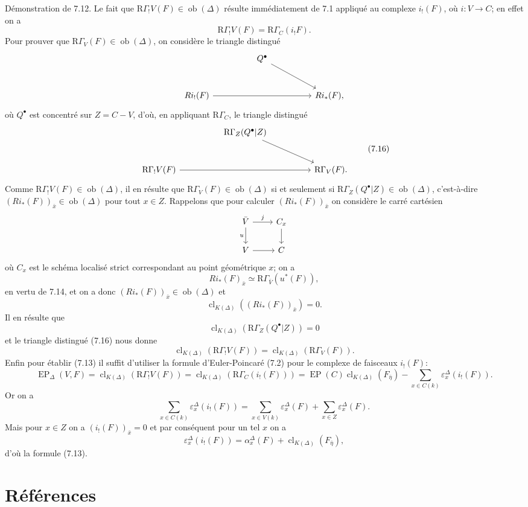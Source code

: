\documentclass[11pt]{article}
\providecommand{\EP}{\operatorname{EP}}
\providecommand{\Ob}{\operatorname{ob}}
\providecommand{\Ob}{\operatorname{ob}}
\providecommand{\EP}{\operatorname{EP}}
\providecommand{\Ob}{\operatorname{Ob}}
\providecommand{\clK}[1]{\operatorname{cl}_{K(#1)}}
\providecommand{\RG}{\mathrm R\Gamma}
\providecommand{\Ob}{\operatorname{ob}}
\providecommand{\Ob}{\operatorname{Ob}}
\begin{document}
Démonstration de 7.12. Le fait que $\RG_!V(F)\in\Ob(\Delta)$ résulte immédiatement de 7.1 appliqué au complexe $i_!(F)$, où $i:V\to C$; en effet on a
\[
\RG_!V(F)=\RG_C(i_!F).
\]
Pour prouver que $\RG_V(F)\in\Ob(\Delta)$, on considère le triangle distingué
\[
\begin{tikzcd}[column sep=huge,row sep=large]
& Q^\bullet \arrow[dr] &\\
Ri_!(F) \arrow[rr] && Ri_*(F),
\end{tikzcd}
\]
où $Q^\bullet$ est concentré sur $Z=C-V$, d'où, en appliquant $\RG_C$, le triangle distingué
\[
\begin{tikzcd}[column sep=huge,row sep=large]
& \RG_Z(Q^\bullet|Z) \arrow[dr] &\\
\RG_!V(F) \arrow[rr] && \RG_V(F).
\end{tikzcd}
\tag{7.16}
\]
Comme $\RG_!V(F)\in\Ob(\Delta)$, il en résulte que $\RG_V(F)\in\Ob(\Delta)$ si et seulement si $\RG_Z(Q^\bullet|Z)\in\Ob(\Delta)$, c'est-à-dire $(Ri_*(F))_{\bar x}\in\Ob(\Delta)$ pour tout $x\in Z$. Rappelons que pour calculer $(Ri_*(F))_{\bar x}$ on considère le carré cartésien
\[
\begin{tikzcd}
\bar V \arrow[r,"j"] \arrow[d,"u"'] & C_x \arrow[d]\\
V \arrow[r] & C
\end{tikzcd}
\]
où $C_x$ est le schéma localisé strict correspondant au point géométrique $x$; on a
\[
Ri_*(F)_{\bar x}\simeq \RG_{\bar V}(u^*(F)),
\]
en vertu de 7.14, et on a donc $(Ri_*(F))_{\bar x}\in\Ob(\Delta)$ et
\[
\clK{\Delta}((Ri_*(F))_{\bar x})=0.
\]
Il en résulte que
\[
\clK{\Delta}(\RG_Z(Q^\bullet|Z))=0
\]
et le triangle distingué (7.16) nous donne
\[
\clK{\Delta}(\RG_!V(F))=\clK{\Delta}(\RG_V(F)).
\]
Enfin pour établir (7.13) il suffit d'utiliser la formule d'Euler-Poincaré (7.2) pour le complexe de faisceaux $i_!(F)$:
\[
\EP_\Delta(V,F)
=
\clK{\Delta}(\RG_!V(F))
=
\clK{\Delta}(\RG_C(i_!(F)))
=
\EP(C)\clK{\Delta}(F_{\bar\eta})
-\sum_{x\in C(k)}\varepsilon_x^\Delta(i_!(F)).
\]
Or on a
\[
\sum_{x\in C(k)}\varepsilon_x^\Delta(i_!(F))
=
\sum_{x\in V(k)}\varepsilon_x^\Delta(F)
+\sum_{x\in Z}\varepsilon_x^\Delta(F).
\]
Mais pour $x\in Z$ on a $(i_!(F))_{\bar x}=0$ et par conséquent pour un tel $x$ on a
\[
\varepsilon_x^\Delta(i_!(F))
=
\alpha_x^\Delta(F)+\clK{\Delta}(F_{\bar\eta}),
\]
d'où la formule (7.13).

\section*{Références}
\end{document}
